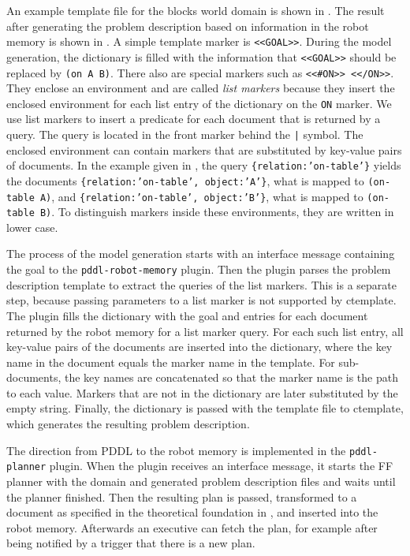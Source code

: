 An example template file for the blocks world domain is shown in
. The result after generating the problem
description based on information in the robot memory is shown in
. A simple template marker is
\texttt{<<GOAL>>}. During the model generation, the dictionary is
filled with the information that \texttt{<<GOAL>>} should be replaced
by \texttt{(on A B)}. There also are special markers such as
\texttt{<<#ON>> <</ON>>}. They enclose an environment and are called
\emph{list markers} because they insert the enclosed environment for
each list entry of the dictionary on the \texttt{ON} marker. We use
list markers to insert a predicate for each document that is returned
by a query. The query is located in the front marker behind the
\texttt{|} symbol. The enclosed environment can contain markers that
are substituted by key-value pairs of documents. In the example given
in , the query \texttt{\{relation:'on-table'\}}
yields the documents \texttt{\{relation:'on-table', object:'A'\}},
what is mapped to \texttt{(on-table A)}, and
\texttt{\{relation:'on-table', object:'B'\}}, what is mapped to
\texttt{(on-table B)}. To distinguish markers inside these
environments, they are written in lower case.

The process of the model generation starts with an interface message
containing the goal to the \texttt{pddl-robot-memory} plugin. Then the
plugin parses the problem description template to extract the queries
of the list markers. This is a separate step, because passing
parameters to a list marker is not supported by ctemplate. The plugin
fills the dictionary with the goal and entries for each document
returned by the robot memory for a list marker query. For each such
list entry, all key-value pairs of the documents are inserted into the
dictionary, where the key name in the document equals the marker name
in the template. For sub-documents, the key names are concatenated so
that the marker name is the path to each value. Markers that are not
in the dictionary are later substituted by the empty string. Finally,
the dictionary is passed with the template file to ctemplate, which
generates the resulting problem description.


The direction from PDDL to the robot memory is implemented in the
\texttt{pddl-planner} plugin. When the plugin receives an interface
message, it starts the FF planner with the domain and generated
problem description files and waits until the planner finished. Then
the resulting plan is passed, transformed to a document as specified
in the theoretical foundation in , and inserted
into the robot memory. Afterwards an executive can fetch the plan, for
example after being notified by a trigger that there is a new plan.

